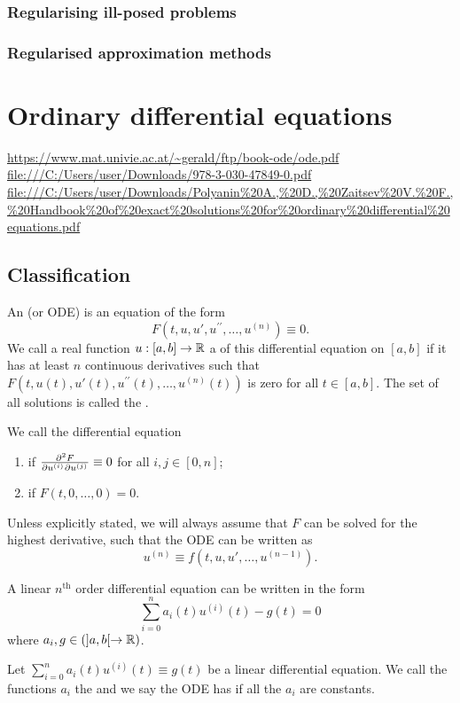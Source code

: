 \subsection{Regularising ill-posed problems}
\subsection{Regularised approximation methods}


\chapter{Ordinary differential equations}
\url{https://www.mat.univie.ac.at/~gerald/ftp/book-ode/ode.pdf}
\url{file:///C:/Users/user/Downloads/978-3-030-47849-0.pdf}
\url{file:///C:/Users/user/Downloads/Polyanin%20A.,%20D.,%20Zaitsev%20V.%20F.,%20Handbook%20of%20exact%20solutions%20for%20ordinary%20differential%20equations.pdf}

\section{Classification}
\begin{definition}
An  (or ODE) is an equation of the form
\[ F(t, u, u', u^{\prime\prime}, \ldots, u^{(n)}) \equiv 0. \]
We call a real function $u: [a,b] \to \mathbb{R}$ a  of this differential equation on $[a,b]$
if it has at least $n$ continuous derivatives such that $F(t, u(t), u'(t), u^{\prime\prime}(t), \ldots, u^{(n)}(t))$ is zero for all $t\in [a,b]$. The set of all solutions is called the .

We call the differential equation
\begin{enumerate}
\item {} if $\md{F}{2}{u^{(i)}}{}{u^{(j)}}{} \equiv 0$ for all $i,j\in [0,n]$;
\item {} if $F(t, 0,\ldots, 0) = 0$.
\end{enumerate}
Unless explicitly stated, we will always assume that $F$ can be solved for the highest derivative, such that the ODE can be written as
\[ u^{(n)} \equiv f(t,u,u',\ldots, u^{(n-1)}). \]
\end{definition}

A linear $n^\text{th}$ order differential equation can be written in the form
\[ \sum_{i=0}^n a_{i}(t)u^{(i)}(t) - g(t) = 0 \]
where $a_i, g \in (]a,b[\to\mathbb{R})$.

\begin{definition}
Let $\sum_{i=0}^n a_{i}(t)u^{(i)}(t) \equiv g(t)$ be a linear differential equation. We call the functions $a_i$ the  and we say the ODE has  if all the $a_i$ are constants.
\end{definition}

